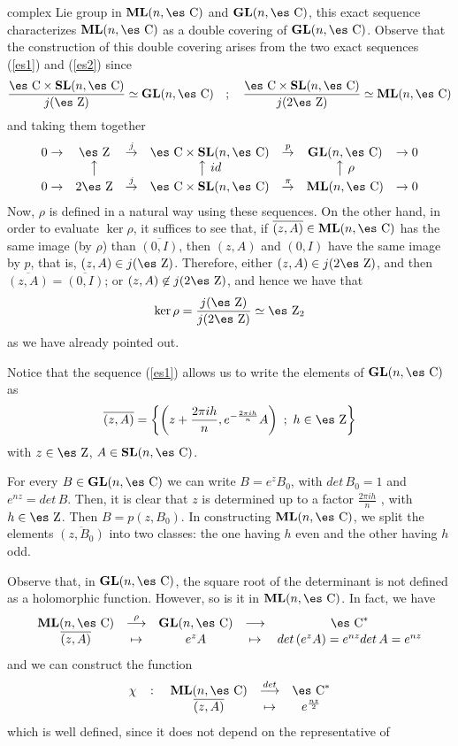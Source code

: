 \documentclass[12pt]{article}
\def\dst{\(}
\def\map#1{\mathrel{\mathop{\to}\limits^{#1}}}
\def\mapping#1{\mathrel{\mathop{\longrightarrow}\limits^{#1}}}
\def\GL{{\bf GL}(n,\Complex )}
\def\SL{{\bf SL}(n,\Complex )}
\def\ML{{\bf ML}(n,\Complex )}
\def\Zahl{\mbox{\es Z}}
\def\Complex{\mbox{\es C}}
\begin{document}
complex Lie group in $\ML$ and $\GL$, this exact sequence
characterizes $\ML$ as a double covering of $\GL$. Observe that
the construction of this double covering arises from the two exact
sequences (\ref{es1}) and (\ref{es2}) since $$ \frac{\Complex
\times \SL}{j(\Zahl)} \simeq \GL \quad ; \quad \frac{\Complex
\times \SL}{j(2\Zahl)} \simeq \ML $$ and taking them together
$$\begin{array}{ccccccc} 0 \map{} &\Zahl& \map{j} &\Complex \times
\SL& \map{p} &\GL& \map{} 0
\\
&\big\uparrow& &\big\uparrow\ id & &\big\uparrow\ \rho &
\\
0 \map{} &2\Zahl& \map{j} &\Complex \times \SL & \map{\pi} &\ML& \map{}
0
\end{array}$$
Now, $\rho$ is defined in a natural way using these sequences.
On the other hand, in order to evaluate $\ker \rho$,
it suffices to see that, if $\overline{(z,A)} \in \ML$
has the same image (by $\rho$) than $\overline{(0,I)}$, then
$(z,A)$ and $(0,I)$ have the same image by $p$, that is,
$(z,A) \in j(\Zahl)$. Therefore, either $(z,A) \in j(2\Zahl)$,
and then $\overline{(z,A)} = \overline{(0,I)}$; or
$(z,A) \not\in j(2\Zahl)$, and hence we have that
$$
\ker \rho = \frac{j(\Zahl)}{j(2\Zahl)} \simeq \Zahl_2
$$
as we have already pointed out.

Notice that the sequence (\ref{es1}) allows us to write the elements of
$\GL$ as
 $$
 \overline{(z,A)} =
 \left\{ \left(z + \frac{2\pi i h}{n},e^{-\frac{2\pi i h}{n}}A \right)
 \ ; \ h \in \Zahl \right\}
 $$
with $z \in \Zahl$, $A \in \SL$.

For every $B \in \GL$ we can write $B = e^{z}B_0$,
with $det\, B_0=1$ and $e^{nz}=det\, B$.
Then, it is clear that $z$ is determined up to a factor
\dst\frac{2\pi i h}{n}\) , with $h\in\Zahl$. Then $B = p(z,B_0)$.
In constructing $\ML$, we split the elements $\overline{(z,B_0)}$
into two classes: the one having $h$ even and the other having $h$ odd.

Observe that,
in $\GL$, the square root of the determinant is not defined as a
holomorphic function.
However, so is it in $\ML$. In fact, we have
$$
\begin{array}{ccccc}
\ML &\mapping{\rho}& \GL &\longrightarrow& \Complex^*
\\
\overline{(z,A)} &\mapsto& e^{z}A &\mapsto&
det\, (e^{z}A) = e^{nz} det\, A = e^{nz}
\end{array}
$$
and we can construct the function
$$
\begin{array}{ccccc}
\chi &\colon &\ML& \mapping{det} & \Complex^*
\\
& & \overline{(z,A)} & \mapsto & e^{\frac{nz}{2}}
\end{array}
$$
which is well defined, since it does not depend on the representative of
\end{document}
